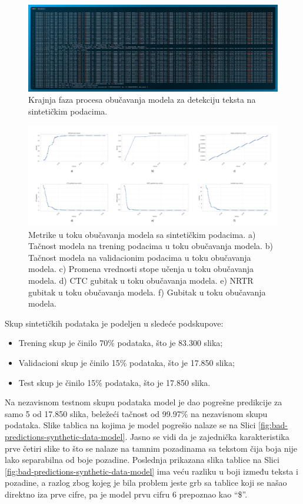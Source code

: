 \documentclass[a4paper,12pt]{article}
\begin{document}
	\begin{figure}[H]
		\centering
		\includegraphics[width=\textwidth]{assets/train-code-synthetic-data.png}
		\caption{Krajnja faza procesa obučavanja modela za detekciju teksta na sintetičkim podacima.}
		\label{fig:train-code-synthetic-data}
	\end{figure}
	
	\begin{figure}[H]
		\centering
		\includegraphics[width=\textwidth]{assets/synthetic-data-metrics.png}
		\caption{Metrike u toku obučavanja modela sa sintetičkim podacima. a) Tačnost modela na trening podacima u toku obučavanja modela. b) Tačnost modela na validacionim podacima u toku obučavanja modela. c) Promena vrednosti stope učenja u toku obučavanja modela. d) CTC gubitak u toku obučavanja modela. e) NRTR gubitak u toku obučavanja modela. f) Gubitak u toku obučavanja modela.}
		\label{fig:synthetic-data-metrics}
	\end{figure}
	
	Skup sintetičkih podataka je podeljen u sledeće podskupove:
	\begin{itemize}
		\item Trening skup je činilo 70\% podataka, što je 83.300 slika;
		\item Validacioni skup je činilo 15\% podataka, što je 17.850 slika;
		\item Test skup je činilo 15\% podataka, što je 17.850 slika.
	\end{itemize}
	
	Na nezavisnom testnom skupu podataka model je dao pogrešne predikcije za samo 5 od 17.850 slika, beležeći tačnost od 99.97\% na nezavisnom skupu podataka. Slike tablica na kojima je model pogrešio nalaze se na Slici \ref{fig:bad-predictions-synthetic-data-model}. Jasno se vidi da je zajednička karakteristika prve četiri slike to što se nalaze na tamnim pozadinama sa tekstom čija boja nije lako separabilna od boje pozadine. Poslednja prikazana slika tablice na Slici \ref{fig:bad-predictions-synthetic-data-model} ima veću razliku u boji između teksta i pozadine, a razlog zbog kojeg je bila problem jeste grb sa tablice koji se našao direktno iza prve cifre, pa je model prvu cifru 6 prepoznao kao \enquote{\$}.
	
\end{document}
